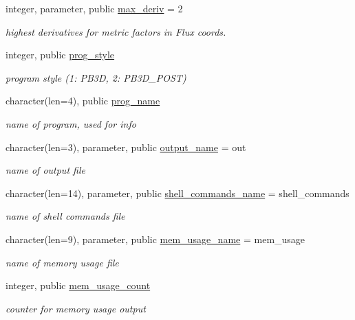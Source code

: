 \begin{DoxyCompactItemize}
integer, parameter, public \hyperlink{namespacenum__vars_a78f5aeea9d9c2f41e388bfcef9021e64}{max\+\_\+deriv} = 2
\begin{DoxyCompactList}\small\item\em highest derivatives for metric factors in Flux coords. \end{DoxyCompactList}\item 
integer, public \hyperlink{namespacenum__vars_a50245a345efb453eda46b3fe98b702e8}{prog\+\_\+style}
\begin{DoxyCompactList}\small\item\em program style (1\+: P\+B3D, 2\+: P\+B3\+D\+\_\+\+P\+O\+ST) \end{DoxyCompactList}\item 
character(len=4), public \hyperlink{namespacenum__vars_a7548fedc0d8f3102844aded2e6c11f82}{prog\+\_\+name}
\begin{DoxyCompactList}\small\item\em name of program, used for info \end{DoxyCompactList}\item 
character(len=3), parameter, public \hyperlink{namespacenum__vars_a0fbc4b8f8965e85d6cb1b1f7894ab698}{output\+\_\+name} = \textquotesingle{}out\textquotesingle{}
\begin{DoxyCompactList}\small\item\em name of output file \end{DoxyCompactList}\item 
character(len=14), parameter, public \hyperlink{namespacenum__vars_af30710083de41ebf93a407412d3125e5}{shell\+\_\+commands\+\_\+name} = \textquotesingle{}shell\+\_\+commands\textquotesingle{}
\begin{DoxyCompactList}\small\item\em name of shell commands file \end{DoxyCompactList}\item 
character(len=9), parameter, public \hyperlink{namespacenum__vars_a88d78503df095a1c19b851caf2d889ba}{mem\+\_\+usage\+\_\+name} = \textquotesingle{}mem\+\_\+usage\textquotesingle{}
\begin{DoxyCompactList}\small\item\em name of memory usage file \end{DoxyCompactList}\item 
integer, public \hyperlink{namespacenum__vars_a7f93ac44620a69373a76d591fa8507a2}{mem\+\_\+usage\+\_\+count}
\begin{DoxyCompactList}\small\item\em counter for memory usage output \end{DoxyCompactList}\item 

\end{DoxyCompactItemize}
